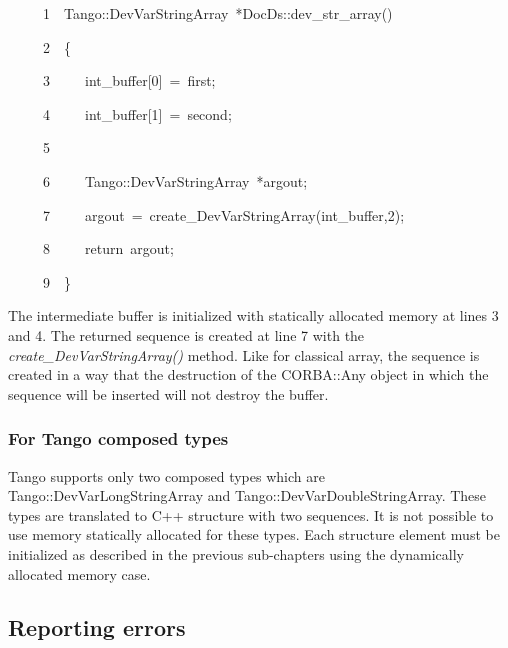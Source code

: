 
\begin{lyxcode}
~~~~~1~~Tango::DevVarStringArray~{*}DocDs::dev\_str\_array()

~~~~~2~~\{

~~~~~3~~~~~int\_buffer{[}0{]}~=~\textquotedbl{}first\textquotedbl{};

~~~~~4~~~~~int\_buffer{[}1{]}~=~\textquotedbl{}second\textquotedbl{};

~~~~~5~~

~~~~~6~~~~~Tango::DevVarStringArray~{*}argout;

~~~~~7~~~~~argout~=~create\_DevVarStringArray(int\_buffer,2);

~~~~~8~~~~~return~argout;

~~~~~9~~\}
\end{lyxcode}


The intermediate buffer is initialized with statically allocated memory
at lines 3 and 4. The returned sequence is created at line 7 with
the \emph{create\_DevVarStringArray()}
method. Like for classical array, the sequence is created in a way
that the destruction of the CORBA::Any object in which
the sequence will be inserted will not destroy the buffer.


\subsubsection{For Tango composed types}

Tango supports only two composed types which are Tango::DevVarLongStringArray
and Tango::DevVarDoubleStringArray.
These types are translated to C++ structure with two sequences. It
is not possible to use memory statically allocated for these types.
Each structure element must be initialized as described in the previous
sub-chapters using the dynamically allocated memory case.


\subsection{Reporting errors\label{sub:Reporting-errors}}

